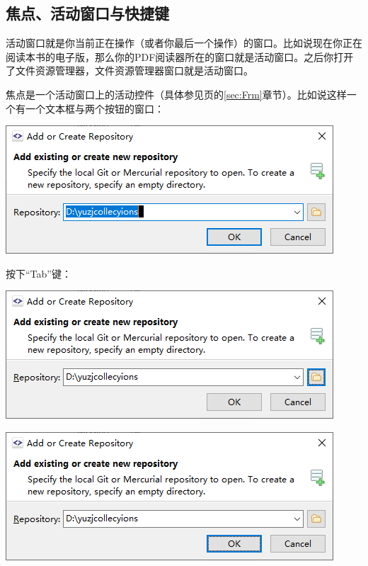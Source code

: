\subsection{焦点、活动窗口与快捷键}
活动窗口就是你当前正在操作（或者你最后一个操作）的窗口。比如说现在你正在阅读本书的电子版，那么你的PDF阅读器所在的窗口就是活动窗口。之后你打开了文件资源管理器，文件资源管理器窗口就是活动窗口。\par
焦点是一个活动窗口上的活动控件（具体参见\pageref{sec:Frm}页的\ref{sec:Frm}章节）。比如说这样一个有一个文本框与两个按钮的窗口：\par
\begin{center}
	\includegraphics[scale=0.5]{pic/forcus1}
\end{center} \par
按下“Tab”键：\par
\begin{center}
	\includegraphics[scale=0.5]{pic/forcus2}
\end{center} \par
\begin{center}
	\includegraphics[scale=0.5]{pic/forcus3}
\end{center} \par
